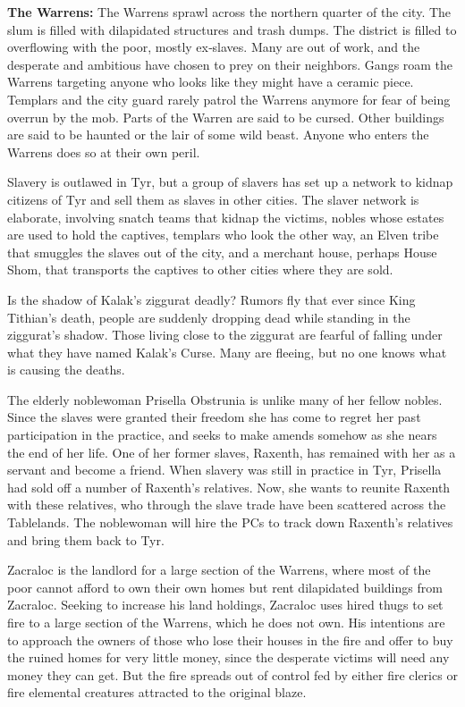 {	\textbf{The Warrens:} The Warrens sprawl across the northern quarter of the city. The slum is filled with dilapidated structures and trash dumps. The district is filled to overflowing with the poor, mostly ex‐slaves. Many are out of work, and the desperate and ambitious have chosen to prey on their neighbors. Gangs roam the Warrens targeting anyone who looks like they might have a ceramic piece. Templars and the city guard rarely patrol the Warrens anymore for fear of being overrun by the mob. Parts of the Warren are said to be cursed. Other buildings are said to be haunted or the lair of some wild beast. Anyone who enters the Warrens does so at their own peril.
}
{
	\item Slavery is outlawed in Tyr, but a group of slavers has set up a network to kidnap citizens of Tyr and sell them as slaves in other cities. The slaver network is elaborate, involving snatch teams that kidnap the victims, nobles whose estates are used to hold the captives, templars who look the other way, an Elven tribe that smuggles the slaves out of the city, and a merchant house, perhaps House Shom, that transports the captives to other cities where they are sold.
	\item Is the shadow of Kalak's ziggurat deadly? Rumors fly that ever since King Tithian's death, people are suddenly dropping dead while standing in the ziggurat's shadow. Those living close to the ziggurat are fearful of falling under what they have named Kalak's Curse. Many are fleeing, but no one knows what is causing the deaths.
	\item The elderly noblewoman Prisella Obstrunia is unlike many of her fellow nobles. Since the slaves were granted their freedom she has come to regret her past participation in the practice, and seeks to make amends somehow as she nears the end of her life. One of her former slaves, Raxenth, has remained with her as a servant and become a friend. When slavery was still in practice in Tyr, Prisella had sold off a number of Raxenth's relatives. Now, she wants to reunite Raxenth with these relatives, who through the slave trade have been scattered across the Tablelands. The noblewoman will hire the PCs to track down Raxenth's relatives and bring them back to Tyr.
	\item Zacraloc is the landlord for a large section of the Warrens, where most of the poor cannot afford to own their own homes but rent dilapidated buildings from Zacraloc. Seeking to increase his land holdings, Zacraloc uses hired thugs to set fire to a large section of the Warrens, which he does not own. His intentions are to approach the owners of those who lose their houses in the fire and offer to buy the ruined homes for very little money, since the desperate victims will need any money they can get. But the fire spreads out of control fed by either fire clerics or fire elemental creatures attracted to the original blaze.
}
